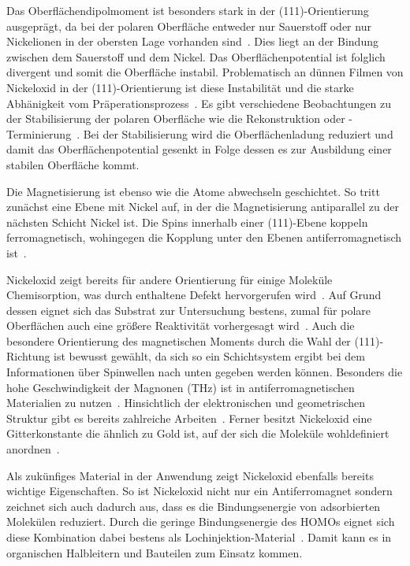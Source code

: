             Das Oberflächendipolmoment ist besonders stark in der (111)-Orientierung ausgeprägt, da bei der polaren Oberfläche entweder nur Sauerstoff oder nur Nickelionen in der obersten Lage vorhanden sind~\cite{NiO_8}.
            Dies liegt an der Bindung zwischen dem Sauerstoff und dem Nickel.
            Das Oberflächenpotential ist folglich divergent und somit die Oberfläche instabil.
            Problematisch an dünnen Filmen von Nickeloxid in der (111)-Orientierung ist diese Instabilität und die starke Abhänigkeit vom Präperationsprozess~\cite{NiO_36}.
            Es gibt verschiedene Beobachtungen zu der Stabilisierung der polaren Oberfläche wie die Rekonstruktion oder -Terminierung~\cite{NiO_36, NiO_35, NiO_34, NiO_27, NiO_10}.
            Bei der Stabilisierung wird die Oberflächenladung reduziert und damit das Oberflächenpotential gesenkt in Folge dessen es zur Ausbildung einer stabilen Oberfläche kommt.

            Die Magnetisierung ist ebenso wie die Atome abwechseln geschichtet.
            So tritt zunächst eine Ebene mit Nickel auf, in der die Magnetisierung antiparallel zu der nächsten Schicht Nickel ist.
            Die Spins innerhalb einer (111)-Ebene koppeln ferromagnetisch, wohingegen die Kopplung unter den Ebenen antiferromagnetisch ist~\cite{FeO_6}.

            Nickeloxid zeigt bereits für andere Orientierung für einige Moleküle Chemisorption, was durch enthaltene Defekt hervorgerufen wird~\cite{kunz_chemisorption_1985}.
            Auf Grund dessen eignet sich das Substrat zur Untersuchung bestens, zumal für polare Oberflächen auch eine größere Reaktivität vorhergesagt wird~\cite{cappus_hydroxyl_1993}.
            Auch die besondere Orientierung des magnetischen Moments durch die Wahl der (111)-Richtung ist bewusst gewählt, da sich so ein Schichtsystem ergibt bei dem Informationen über Spinwellen nach unten gegeben werden können.
            Besonders die hohe Geschwindigkeit der Magnonen (\si{\tera\hertz}) ist in antiferromagnetischen Materialien zu nutzen~\cite{bossini_macrospin_2016}.
            Hinsichtlich der elektronischen und geometrischen Struktur gibt es bereits zahlreiche Arbeiten~\cite{NiO_7, NiO_34, NiO_35, NiO_37, NiO_8, NiO_13}.
            Ferner besitzt Nickeloxid eine Gitterkonstante die ähnlich zu Gold ist, auf der sich die Moleküle wohldefiniert anordnen~\cite{5A_1}.
            
            Als zukünfiges Material in der Anwendung zeigt Nickeloxid ebenfalls bereits wichtige Eigenschaften.
            So ist Nickeloxid nicht nur ein Antiferromagnet sondern zeichnet sich auch dadurch aus, dass es die Bindungsenergie von adsorbierten Molekülen reduziert.
            Durch die geringe Bindungsenergie des HOMOs eignet sich diese Kombination dabei bestens als Lochinjektion-Material~\cite{IF_3}.
            Damit kann es in organischen Halbleitern und Bauteilen zum Einsatz kommen.

